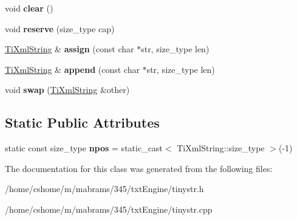 \begin{DoxyCompactItemize}
\item 
\hypertarget{class_ti_xml_string_ab20e06e4c666abf3bdbfb3a1191d4888}{
void {\bfseries clear} ()}
\label{class_ti_xml_string_ab20e06e4c666abf3bdbfb3a1191d4888}

\item 
\hypertarget{class_ti_xml_string_a88ecf9f0f00cb5c67b6b637958d7049c}{
void {\bfseries reserve} (size\_\-type cap)}
\label{class_ti_xml_string_a88ecf9f0f00cb5c67b6b637958d7049c}

\item 
\hypertarget{class_ti_xml_string_ac72f3d9149b7812c1e6c59402014d0d5}{
\hyperlink{class_ti_xml_string}{TiXmlString} \& {\bfseries assign} (const char $\ast$str, size\_\-type len)}
\label{class_ti_xml_string_ac72f3d9149b7812c1e6c59402014d0d5}

\item 
\hypertarget{class_ti_xml_string_ad44b21700d2ec24a511367b222b643fb}{
\hyperlink{class_ti_xml_string}{TiXmlString} \& {\bfseries append} (const char $\ast$str, size\_\-type len)}
\label{class_ti_xml_string_ad44b21700d2ec24a511367b222b643fb}

\item 
\hypertarget{class_ti_xml_string_aa392cbc180752a79f007f4f9280c7762}{
void {\bfseries swap} (\hyperlink{class_ti_xml_string}{TiXmlString} \&other)}
\label{class_ti_xml_string_aa392cbc180752a79f007f4f9280c7762}

\end{DoxyCompactItemize}
\subsection*{Static Public Attributes}
\begin{DoxyCompactItemize}
\item 
\hypertarget{class_ti_xml_string_a8f4422d227088dc7bec96f479b275d0a}{
static const size\_\-type {\bfseries npos} = static\_\-cast$<$ TiXmlString::size\_\-type $>$(-\/1)}
\label{class_ti_xml_string_a8f4422d227088dc7bec96f479b275d0a}

\end{DoxyCompactItemize}


The documentation for this class was generated from the following files:\begin{DoxyCompactItemize}
\item 
/home/cshome/m/mabrams/345/txtEngine/tinystr.h\item 
/home/cshome/m/mabrams/345/txtEngine/tinystr.cpp\end{DoxyCompactItemize}
